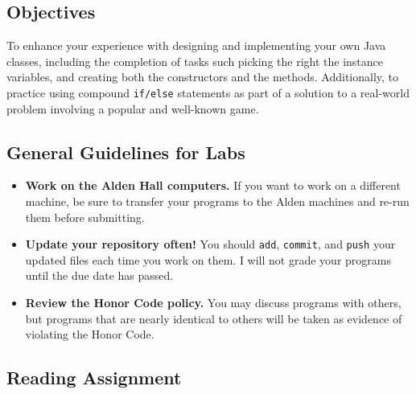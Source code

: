 



\vspace{-0.2in}
\subsection*{Objectives}
\vspace{-0.05in}

To enhance your experience with designing and implementing your own Java classes, including the completion of tasks such
picking the right the instance variables, and creating both the constructors and the methods.  Additionally, to practice
using compound {\tt if/else} statements as part of a solution to a real-world problem involving a popular and well-known
game.

\vspace{-0.15in}
\subsection*{General Guidelines for Labs}
\vspace{-0.05in}
\begin{itemize}
\item
{\bf Work on the Alden Hall computers.} If you want to work on a different
machine, be sure to transfer your programs to the Alden
machines and re-run them before submitting.
\item
  {\bf Update your repository often!} You should {\tt add}, {\tt commit}, 
  and {\tt push} your updated files each time you work on them.  I will not grade 
your programs until the due date has passed.
\item
{\bf Review the Honor Code policy.} You
may discuss programs with others, but programs that are nearly identical
to others will be taken as evidence of violating the Honor Code.
\end{itemize}

\vspace{-0.15in}
\subsection*{Reading Assignment}
\vspace{-0.05in}

